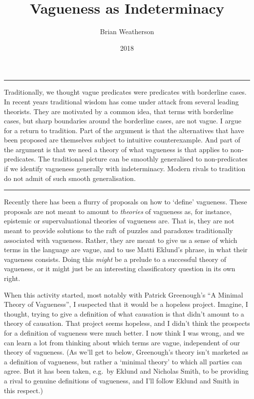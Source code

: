 \documentclass[
  10pt,
  letterpaper,
  DIV=11,
  numbers=noendperiod,
  twoside]{scrartcl}
\title{Vagueness as Indeterminacy}
\author{Brian Weatherson}
\date{2018}
\renewenvironment{abstract}
 {\vspace{-1.25cm}
 \quotation\small\noindent\rule{\linewidth}{.5pt}\par\smallskip
 \noindent }
 {\par\noindent\rule{\linewidth}{.5pt}\endquotation}
\begin{document}
\maketitle
\begin{abstract}
Traditionally, we thought vague predicates were predicates with
borderline cases. In recent years traditional wisdom has come under
attack from several leading theorists. They are motivated by a common
idea, that terms with borderline cases, but sharp boundaries around the
borderline cases, are not vague. I argue for a return to tradition. Part
of the argument is that the alternatives that have been proposed are
themselves subject to intuitive counterexample. And part of the argument
is that we need a theory of what vagueness is that applies to
non-predicates. The traditional picture can be smoothly generalised to
non-predicates if we identify vagueness generally with indeterminacy.
Modern rivals to tradition do not admit of such smooth generalisation.
\end{abstract}


Recently there has been a flurry of proposals on how to `define'
vagueness. These proposals are not meant to amount to \emph{theories} of
vagueness as, for instance, epistemic or supervaluational theories of
vagueness are. That is, they are not meant to provide solutions to the
raft of puzzles and paradoxes traditionally associated with vagueness.
Rather, they are meant to give us a sense of which terms in the language
are vague, and to use Matti Eklund's phrase, in what their vagueness
consists. Doing this \emph{might} be a prelude to a successful theory of
vagueness, or it might just be an interesting classificatory question in
its own right.

When this activity started, most notably with Patrick Greenough's ``A
Minimal Theory of Vagueness'', I suspected that it would be a hopeless
project. Imagine, I thought, trying to give a definition of what
causation is that didn't amount to a theory of causation. That project
seems hopeless, and I didn't think the prospects for a definition of
vagueness were much better. I now think I was wrong, and we can learn a
lot from thinking about which terms are vague, independent of our theory
of vagueness. (As we'll get to below, Greenough's theory isn't marketed
as a definition of vagueness, but rather a `minimal theory' to which all
parties can agree. But it has been taken, e.g.~by Eklund and Nicholas
Smith, to be providing a rival to genuine definitions of vagueness, and
I'll follow Eklund and Smith in this respect.)
\end{document}
